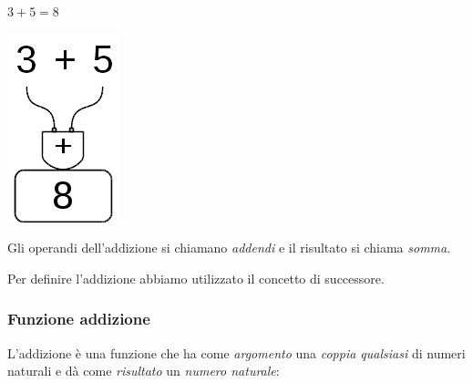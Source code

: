 \begin{minipage}{0.80\textwidth}
 \centering
 \(3+5=8\)

 
\end{minipage}%
\begin{minipage}{0.15\textwidth}
 \centering
\begin{inaccessibleblock}
 \includegraphics[scale=0.35]{img/op_add.png}
\end{inaccessibleblock}
\end{minipage}%

Gli operandi dell'addizione si chiamano \emph{addendi} e il risultato si 
chiama \emph{somma}.

\osservazione Per definire l'addizione abbiamo utilizzato il concetto di 
successore.

\subsubsection{Funzione addizione}

L'addizione è una funzione che ha come \emph{argomento} una \emph{coppia 
qualsiasi} di numeri naturali e dà come \emph{risultato} un \emph{numero 
naturale}:

\vspace{1em}
\begin{minipage}[t]{.48\textwidth}
\begin{center}
\begin{inaccessibleblock}
\end{inaccessibleblock}
\end{center}
\end{minipage}
\hfill
\begin{minipage}[t]{.48\textwidth}
\begin{center}
\begin{inaccessibleblock}
\end{inaccessibleblock}
\end{center}
\end{minipage}

